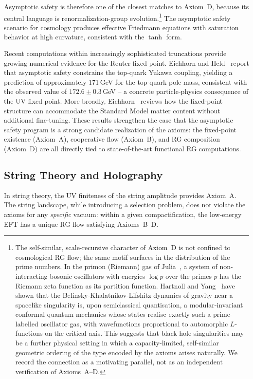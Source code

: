 \documentclass[aps,prd,twocolumn,superscriptaddress,nofootinbib]{revtex4-2}
\begin{document}
Asymptotic safety is therefore one of the closest matches to Axiom~D, because its central language is renormalization-group evolution.\footnote{The self-similar, scale-recursive character of Axiom~D is not
confined to cosmological RG flow; the same motif surfaces in the distribution
of the prime numbers. In the primon (Riemann) gas of Julia~\cite{Julia1990}, a
system of non-interacting bosonic oscillators with energies $\log p$ over the
primes $p$ has the Riemann zeta function as its partition function.
Hartnoll and Yang~\cite{HartnollYang2025} have shown that the
Belinsky-Khalatnikov-Lifshitz dynamics of gravity near a spacelike singularity
is, upon semiclassical quantisation, a modular-invariant conformal quantum
mechanics whose states realise exactly such a prime-labelled oscillator gas,
with wavefunctions proportional to automorphic $L$-functions on the critical
axis. This suggests that black-hole singularities may be a further physical
setting in which a capacity-limited, self-similar geometric ordering of the
type encoded by the axioms arises naturally. We record the connection as a
motivating parallel, not as an independent verification of Axioms~A--D.} The asymptotic safety scenario for cosmology \cite{Bonanno2002} produces effective Friedmann equations with saturation behavior at high curvature, consistent with the $\tanh$ form.

Recent computations within increasingly sophisticated truncations provide growing numerical evidence for the Reuter fixed point. Eichhorn and Held~\cite{EichhornHeld2018} report that asymptotic safety constrains the top-quark Yukawa coupling, yielding a prediction of approximately 171\,GeV for the top-quark pole mass, consistent with the observed value of $172.6 \pm 0.3$\,GeV \cite{PDG2024} -- a concrete particle-physics consequence of the UV fixed point. More broadly, Eichhorn~\cite{Eichhorn2020} reviews how the fixed-point structure can accommodate the Standard Model matter content without additional fine-tuning. These results strengthen the case that the asymptotic safety program is a strong candidate realization of the axioms: the fixed-point existence (Axiom~A), cooperative flow (Axiom~B), and RG composition (Axiom~D) are all directly tied to state-of-the-art functional RG computations.

\subsection{String Theory and Holography}

In string theory, the UV finiteness of the string amplitude provides Axiom~A. The string landscape, while introducing a selection problem, does not violate the axioms for any \textit{specific} vacuum: within a given compactification, the low-energy EFT has a unique RG flow satisfying Axioms~B--D.
\end{document}
